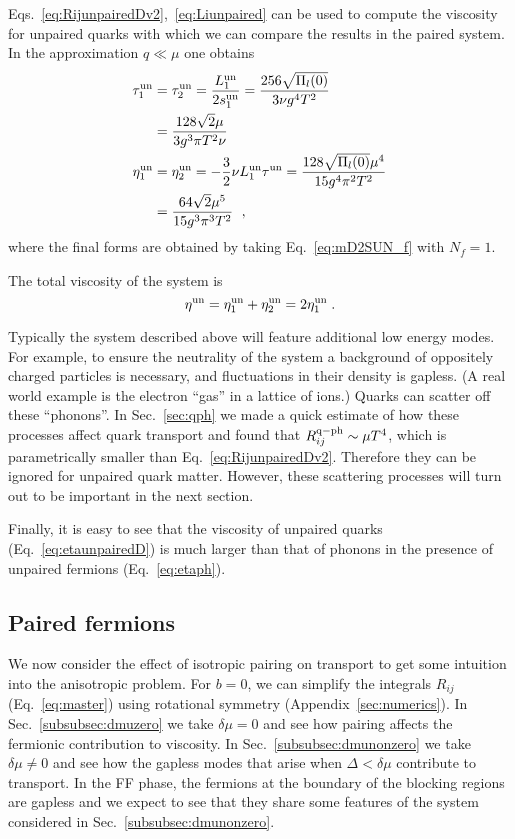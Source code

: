 \documentclass[10pt, aps, prd, superscriptaddress, nofootinbib, 
               amsmath, amssymb, twocolumn,
               preprintnumbers, showpacs,
               raggedbottom,
               floatfix]{revtex4-1}
\newcommand{\dmu}{{\delta\mu}}
\newcommand{\un}{{\rm{un}}}
\begin{document}
Eqs.~\ref{eq:RijunpairedDv2},~\ref{eq:Liunpaired} can be used to compute the
viscosity for unpaired quarks with which we can compare the results in the 
paired system. In the approximation $q\ll\mu$ one obtains 
\begin{equation}
\begin{split}
\tau_1^{\un}&=\tau_2^{\un} = \frac{L_1^\un}{2s_1^\un} =
\frac{256\sqrt{\Pi_l(0)}}{3\nu g^4T^2}\\
&=\frac{128\sqrt{2}\mu}{3 g^3\pi T^2\nu}\\
\eta_1^\un &= \eta_2^\un = -\frac{3}{2}\nu{L_1^\un}{\tau^\un} =
\frac{128\sqrt{\Pi_l(0)}\mu^4}{15g^4\pi^2T^2}\\
&=\frac{64\sqrt{2}\mu^5}{15g^3\pi^3T^2}
~\label{eq:etaunpairedD}\;,
\end{split}
\end{equation}
where the final forms are obtained by taking
Eq.~\ref{eq:mD2SUN_f} with $N_f=1$.

The total viscosity of the system is 
\begin{equation}
\eta^\un = \eta_1^\un+\eta_2^\un = 2\eta_1^\un\;. 
\end{equation}

Typically the system described above will feature additional low energy modes.
For example, to ensure the neutrality of the system a background of oppositely charged particles
is necessary, and fluctuations in their density is gapless. (A real world
example is the electron ``gas'' in a lattice of ions.) Quarks can scatter off
these ``phonons''. In Sec.~\ref{sec:qph} we made a quick estimate of how these
processes affect quark transport and found that $R_{ij}^{{\rm{q-ph}}}\sim
\mu T^4$, which is parametrically smaller than
Eq.~\ref{eq:RijunpairedDv2}. Therefore they can be ignored for unpaired quark
matter. However, these scattering processes will turn out to be important in
the next section. 

Finally, it is easy to see that the viscosity of unpaired quarks
(Eq.~\ref{eq:etaunpairedD}) is much larger than that of phonons in the presence
of unpaired fermions (Eq.~\ref{eq:etaph}).

\subsection{Paired fermions}
\label{subsec:Paired}
We now consider the effect of isotropic pairing on transport to get some
intuition into the anisotropic problem. For $b=0$, we
can simplify the integrals $R_{ij}$ (Eq.~\ref{eq:master}) using rotational
symmetry (Appendix~\ref{sec:numerics}).  In
Sec.~\ref{subsubsec:dmuzero} we take $\dmu=0$ and see how pairing affects the fermionic
contribution to viscosity. In Sec.~\ref{subsubsec:dmunonzero} we take $\delta\mu\neq0$
and see how the gapless modes that arise when $\Delta<\delta\mu$ contribute to
transport. In the FF phase, the fermions at the boundary of the blocking
regions are gapless and we expect to see that they share some features of the
system considered in Sec.~\ref{subsubsec:dmunonzero}.
 
\end{document}
